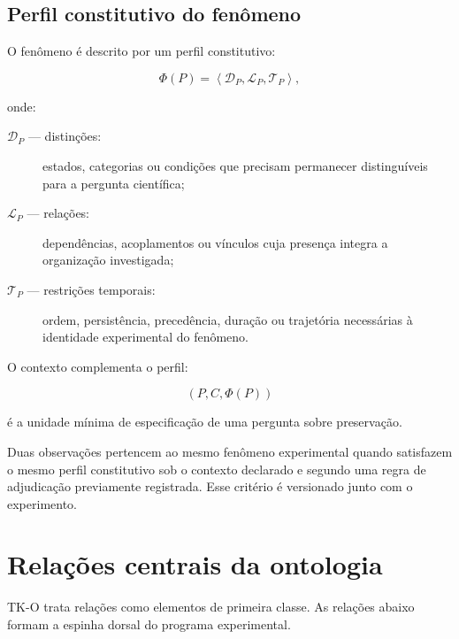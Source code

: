 \documentclass[11pt,a4paper]{article}
\begin{document}
\subsection{Perfil constitutivo do fenômeno}

O fenômeno é descrito por um perfil constitutivo:

\[
\Phi(P)=\left\langle
\mathcal{D}_P,
\mathcal{L}_P,
\mathcal{T}_P
\right\rangle,
\]

onde:

\begin{description}
  \item[$\mathcal{D}_P$ — distinções:] estados, categorias ou condições que precisam
  permanecer distinguíveis para a pergunta científica;
  \item[$\mathcal{L}_P$ — relações:] dependências, acoplamentos ou vínculos cuja
  presença integra a organização investigada;
  \item[$\mathcal{T}_P$ — restrições temporais:] ordem, persistência, precedência,
  duração ou trajetória necessárias à identidade experimental do fenômeno.
\end{description}

O contexto complementa o perfil:

\[
(P,C,\Phi(P))
\]

é a unidade mínima de especificação de uma pergunta sobre preservação.

\begin{ontologybox}
Duas observações pertencem ao mesmo fenômeno experimental quando satisfazem o mesmo
perfil constitutivo sob o contexto declarado e segundo uma regra de adjudicação
previamente registrada. Esse critério é versionado junto com o experimento.
\end{ontologybox}

\section{Relações centrais da ontologia}

TK-O trata relações como elementos de primeira classe. As relações abaixo formam a
espinha dorsal do programa experimental.
\end{document}
